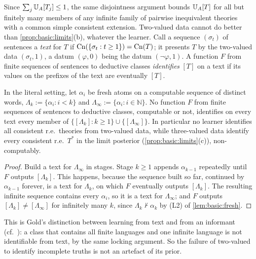 Since $\sum_j\mathbb{U}_{A}[T_j]\le1$, the same disjointness argument bounds $\mathbb{U}_{A}[T]$ for all but finitely many members of any infinite family of pairwise inequivalent theories with a common simple consistent extension. Two-valued data cannot do better than \cref{prop:basic:limits}(b), whatever the learner. Call a sequence $(\sigma_t)$ of sentences a \emph{text} for $T$ if $\mathrm{Cn}(\{\sigma_t:t\ge1\})=\mathrm{Cn}(T)$; it presents $T$ by the two-valued data $(\sigma_t,1)$, a datum $(\varphi,0)$ being the datum $(\neg\varphi,1)$. A function $F$ from finite sequences of sentences to deductive classes \emph{identifies} $[T]$ on a text if its values on the prefixes of the text are eventually $[T]$.

\begin{proposition}\label{prop:basic:textinformant}
In the literal setting, let $\alpha_i$ be fresh atoms on a computable sequence of distinct words, $\Lambda_k:=\{\alpha_i:i<k\}$ and $\Lambda_\infty:=\{\alpha_i:i\in\mathbb N\}$. No function $F$ from finite sequences of sentences to deductive classes, computable or not, identifies on every text every member of $\{[\Lambda_k]:k\ge1\}\cup\{[\Lambda_\infty]\}$. In particular no learner identifies all consistent r.e.\ theories from two-valued data, while three-valued data identify every consistent r.e.\ $T^*$ in the limit posterior (\cref{prop:basic:limits}(c)), non-computably.
\end{proposition}

\begin{proof}
Build a text for $\Lambda_\infty$ in stages. Stage $k\ge1$ appends $\alpha_{k-1}$ repeatedly until $F$ outputs $[\Lambda_k]$. This happens, because the sequence built so far, continued by $\alpha_{k-1}$ forever, is a text for $\Lambda_k$, on which $F$ eventually outputs $[\Lambda_k]$. The resulting infinite sequence contains every $\alpha_i$, so it is a text for $\Lambda_\infty$; and $F$ outputs $[\Lambda_k]\ne[\Lambda_\infty]$ for infinitely many $k$, since $\Lambda_k\nvdash\alpha_k$ by (L2) of \cref{lem:basic:fresh}.
\end{proof}

This is Gold's distinction between learning from text and from an informant (cf.\ \citealp{gold1967language}): a class that contains all finite languages and one infinite language is not identifiable from text, by the same locking argument. So the failure of two-valued \SAIabbr to identify incomplete truths is not an artefact of its prior.

